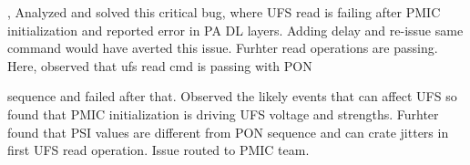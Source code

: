 \begin{itemize}
{      %
      \item {}, Analyzed and solved this critical bug, where UFS read is failing after PMIC initialization and reported error in PA DL layers. Adding delay and re-issue same command would have averted this issue. Furhter read operations are passing. Here, observed that ufs read cmd is passing with PON
\framebreak
}
\end{itemize}\vspace{-\topsep}%
sequence and failed after that. Observed the likely events that can affect UFS so found that PMIC initialization is driving UFS voltage and strengths. Furhter found that PSI values are different from PON sequence and can crate jitters in first UFS read operation. Issue routed to PMIC team.
\sectionsep

%
%
%
%
\MainSubHeadingNote{\CompanyIVExp{} | \CompanyIVLoc{}}

